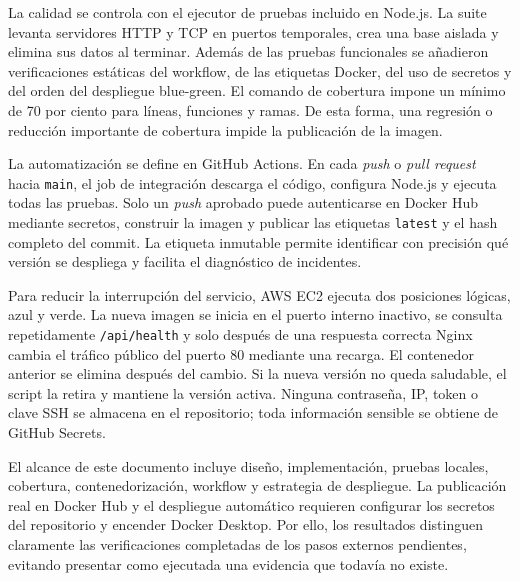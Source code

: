 \documentclass[12pt,letterpaper]{article}
\begin{document}
La calidad se controla con el ejecutor de pruebas incluido en Node.js. La suite levanta servidores HTTP y TCP en puertos temporales, crea una base aislada y elimina sus datos al terminar. Además de las pruebas funcionales se añadieron verificaciones estáticas del workflow, de las etiquetas Docker, del uso de secretos y del orden del despliegue blue-green. El comando de cobertura impone un mínimo de 70 por ciento para líneas, funciones y ramas. De esta forma, una regresión o reducción importante de cobertura impide la publicación de la imagen.

La automatización se define en GitHub Actions. En cada \textit{push} o \textit{pull request} hacia \texttt{main}, el job de integración descarga el código, configura Node.js y ejecuta todas las pruebas. Solo un \textit{push} aprobado puede autenticarse en Docker Hub mediante secretos, construir la imagen y publicar las etiquetas \texttt{latest} y el hash completo del commit. La etiqueta inmutable permite identificar con precisión qué versión se despliega y facilita el diagnóstico de incidentes.

Para reducir la interrupción del servicio, AWS EC2 ejecuta dos posiciones lógicas, azul y verde. La nueva imagen se inicia en el puerto interno inactivo, se consulta repetidamente \texttt{/api/health} y solo después de una respuesta correcta Nginx cambia el tráfico público del puerto 80 mediante una recarga. El contenedor anterior se elimina después del cambio. Si la nueva versión no queda saludable, el script la retira y mantiene la versión activa. Ninguna contraseña, IP, token o clave SSH se almacena en el repositorio; toda información sensible se obtiene de GitHub Secrets.

El alcance de este documento incluye diseño, implementación, pruebas locales, cobertura, contenedorización, workflow y estrategia de despliegue. La publicación real en Docker Hub y el despliegue automático requieren configurar los secretos del repositorio y encender Docker Desktop. Por ello, los resultados distinguen claramente las verificaciones completadas de los pasos externos pendientes, evitando presentar como ejecutada una evidencia que todavía no existe.

\newpage
\end{document}

